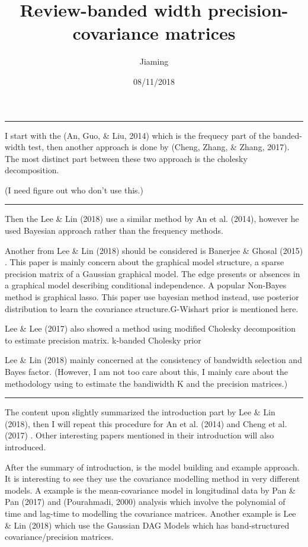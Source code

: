 \documentclass[]{article}
\title{Review-banded width precision-covariance matrices}
\author{Jiaming}
\date{08/11/2018}
\begin{document}
\maketitle

\begin{center}\rule{0.5\linewidth}{\linethickness}\end{center}

I start with the (An, Guo, \& Liu, 2014) which is the frequecy part of
the banded-width test, then another approach is done by (Cheng, Zhang,
\& Zhang, 2017). The most distinct part between these two approach is
the cholesky decomposition.

(I need figure out who don't use this.)

\begin{center}\rule{0.5\linewidth}{\linethickness}\end{center}

Then the Lee \& Lin (2018) use a similar method by An et al. (2014),
however he used Bayesian approach rather than the frequency methods.

Another from Lee \& Lin (2018) should be considered is Banerjee \&
Ghosal (2015) . This paper is mainly concern about the graphical model
structure, a sparse precision matrix of a Gaussian graphical model. The
edge presents or absences in a graphical model describing conditional
independence. A popular Non-Bayes method is graphical lasso. This paper
use bayesian method instead, use posterior distribution to learn the
covariance structure.G-Wishart prior is mentioned here.

Lee \& Lee (2017) also showed a method using modified Cholesky
decomposition to estimate precision matrix. k-banded Cholesky prior

Lee \& Lin (2018) mainly concerned at the consistency of bandwidth
selection and Bayes factor. (However, I am not too care about this, I
mainly care about the methodology using to estimate the bandiwidth K and
the precision matrices.)

\begin{center}\rule{0.5\linewidth}{\linethickness}\end{center}

The content upon slightly summarized the introduction part by Lee \& Lin
(2018), then I will repeat this procedure for An et al. (2014) and Cheng
et al. (2017) . Other interesting papers mentioned in their introduction
will also introduced.

After the summary of introduction, is the model building and example
approach. It is interesting to see they use the covariance modelling
method in very different models. A example is the mean-covariance model
in longitudinal data by Pan \& Pan (2017) and (Pourahmadi, 2000)
analysis which involve the polynomial of time and lag-time to modelling
the covariance matrices. Another example is Lee \& Lin (2018) which use
the Gaussian DAG Models which has band-structured covariance/precision
matrices.
\end{document}
